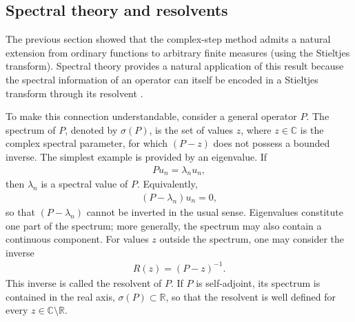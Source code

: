\documentclass[11pt]{article}
\begin{document}
    \subsection{Spectral theory and resolvents}
    
    The previous section showed that the complex-step method admits a natural extension from ordinary functions to arbitrary finite measures (using the Stieltjes transform). Spectral theory provides a natural application of this result because the spectral information of an operator can itself be encoded in a Stieltjes transform through its resolvent \citep[e.g.][]{hislop2012introduction,zworski2012semiclassical}.
    
    To make this connection understandable, consider a general operator \(P\). The spectrum of \(P\), denoted by \(\sigma(P)\), is the set of values \(z\), where \(z\in\mathbb{C}\) is the complex spectral parameter, for which \((P-z)\) does not possess a bounded inverse. The simplest example is provided by an eigenvalue. If
    \begin{align}
    	Pu_n=\lambda_nu_n,
    \end{align}
    then \(\lambda_n\) is a spectral value of \(P\). Equivalently,
    \begin{align}
    	(P-\lambda_n)u_n=0,
    \end{align}
    so that \((P-\lambda_n)\) cannot be inverted in the usual sense. Eigenvalues constitute one part of the spectrum; more generally, the spectrum may also contain a continuous component. For values \(z\) outside the spectrum, one may consider the inverse
    \begin{align}
    	R(z)=(P-z)^{-1}.
    \end{align}
    This inverse is called the resolvent of \(P\).  If \(P\) is self-adjoint, its spectrum is contained in the real axis, \(\sigma(P)\subset\mathbb{R}\), so that the resolvent is well defined for every \(z\in\mathbb{C}\setminus\mathbb{R}\).
    
\end{document}
